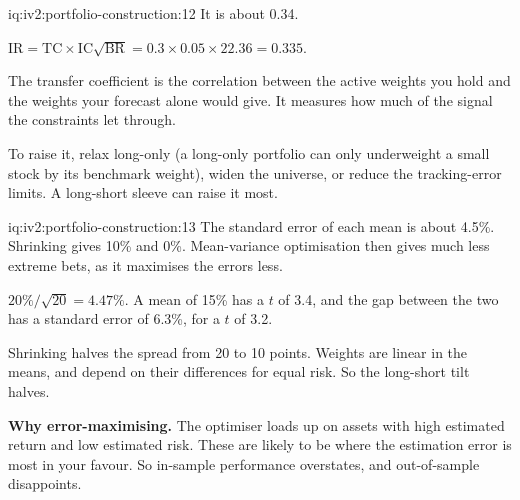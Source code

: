 \begin{solution}{iq:iv2:portfolio-construction:12}
It is about 0.34.

$\mathrm{IR} = \mathrm{TC} \times \mathrm{IC}\sqrt{\mathrm{BR}} = 0.3 \times 0.05 \times 22.36 = 0.335$.

The transfer coefficient is the correlation between the active weights you hold and the weights your forecast alone would give. It measures how much of the signal the constraints let through.

To raise it, relax long-only (a long-only portfolio can only underweight a small stock by its benchmark weight), widen the universe, or reduce the tracking-error limits. A long-short sleeve can raise it most.

\end{solution}

\begin{solution}{iq:iv2:portfolio-construction:13}
The standard error of each mean is about 4.5\%. Shrinking gives 10\% and 0\%. Mean-variance optimisation then gives much less extreme bets, as it maximises the errors less.

$20\%/\sqrt{20} = 4.47\%$. A mean of 15\% has a $t$ of 3.4, and the gap between the two has a standard error of 6.3\%, for a $t$ of 3.2.

Shrinking halves the spread from 20 to 10 points. Weights are linear in the means, and depend on their differences for equal risk. So the long-short tilt halves.

\textbf{Why error-maximising.} The optimiser loads up on assets with high estimated return and low estimated risk. These are likely to be where the estimation error is most in your favour. So in-sample performance overstates, and out-of-sample disappoints.

\end{solution}

